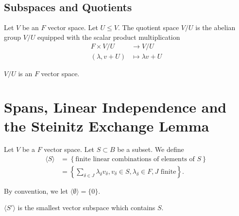 \documentclass[12pt]{article}
\begin{document}
\subsection{Subspaces and Quotients}%
\label{sub:subspaces_and_quotients}

\begin{definition}[Quotient]
	Let $V$ be an $F$ vector space. Let $U \leq V$. The quotient space $V / U$ is the abelian group $V/U$ equipped with the scalar product multiplication
	\begin{align*}
		F \times V/U &\to V/U \\
		(\lambda, v + U) &\mapsto \lambda v + U
	\end{align*}
\end{definition}

\begin{proposition}
	$V/U$ is an $F$ vector space.
\end{proposition}

\newpage

\section{Spans, Linear Independence and the Steinitz Exchange Lemma}%
\label{sec:spans_linear_independence_and_the_steinitz_exchange_lemma}

\begin{definition}
	Let $V$ be a $F$ vector space. Let $S \subset B$ be a subset. We define
	\begin{align*}
		\langle S \rangle &= \left\{ \text{finite linear combinations of elements of } S \right\} \\
				  &= \left\{ \sum_{\delta \in J} \lambda_{\delta} v_{\delta},  v_{\delta} \in S,  \lambda_{\delta} \in F, J \text{ finite} \right\}.
	\end{align*}
\end{definition}

By convention, we let $\langle \emptyset \rangle = \{0\}$.

\begin{remark}
	$\langle S' \rangle$ is the smallest vector subspace which contains $S$.
\end{remark}
\end{document}
